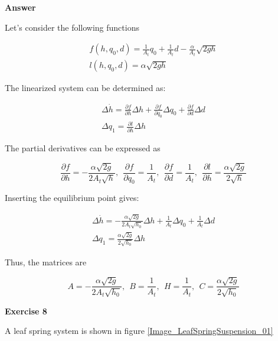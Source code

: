 \textbf{Answer}

Let's consider the following functions

\begin{eqnarray}
f(h,q_0,d) = \frac{1}{A_t}q_0 + \frac{1}{A_t}d - \frac{\alpha}{A_t}\sqrt{2gh} \nonumber \\
l(h, q_0, d) = \alpha \sqrt{2gh}   \nonumber
\end{eqnarray}

The linearized system can be determined as: 

\begin{eqnarray}
\Delta \dot{h} = \frac{\partial f}{\partial h} \Delta h + \frac{\partial f}{\partial q_0} \Delta q_0 + \frac{\partial f}{\partial d} \Delta d  \nonumber \\
\Delta q_1 = \frac{\partial l}{\partial h} \Delta h   \nonumber
\end{eqnarray}

The partial derivatives can be expressed as 

\begin{equation}
\frac{\partial f}{\partial h} = -\frac{\alpha \sqrt{2g}}{2A_t\sqrt{h}}, ~~ \frac{\partial f}{\partial q_0} = \frac{1}{A_t}, ~~ \frac{\partial f}{\partial d} = \frac{1}{A_t}, ~~ \frac{\partial l}{\partial h} = \frac{\alpha \sqrt{2g}}{2\sqrt{h}}    \nonumber
\end{equation}

Inserting the equilibrium point gives: 

\begin{eqnarray}
\Delta \dot{h} = -\frac{\alpha \sqrt{2g}}{2A_t\sqrt{h_0}} \Delta h + \frac{1}{A_t} \Delta q_0 + \frac{1}{A_t} \Delta d  \nonumber \\
\Delta q_1 = \frac{\alpha \sqrt{2g}}{2\sqrt{h_0}} \Delta h   \nonumber
\end{eqnarray}

Thus, the matrices are

\begin{equation}
A =-\frac{\alpha \sqrt{2g}}{2A_t\sqrt{h_0}}, ~~ B = \frac{1}{A_t}, ~~ H = \frac{1}{A_t}, ~~ C= \frac{\alpha \sqrt{2g}}{2\sqrt{h_0}} \nonumber
\end{equation}


\textbf{Exercise 8}

A leaf spring system is shown in figure \ref{Image_LeafSpringSuspension_01}


